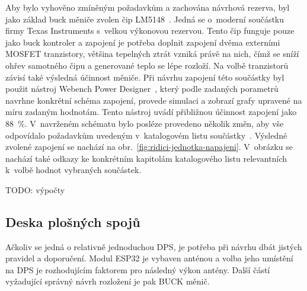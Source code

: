         Aby bylo vyhověno zmíněným požadavkům a zachována návrhová rezerva, byl jako základ buck měniče zvolen čip LM5148~\cite{lm5148-datasheet}. Jedná se o~moderní součástku firmy Texas Instruments s~velkou výkonovou rezervou. Tento čip funguje pouze jako buck kontroler a zapojení je potřeba doplnit zapojení dvěma externími MOSFET tranzistory, většina tepelných ztrát vzniká právě na nich, čímž se sníží ohřev samotného čipu a generované teplo se lépe rozloží. Na volbě tranzistorů závisí také výsledná účinnost měniče. Při návrhu zapojení této součástky byl použit nástroj Webench Power Designer~\cite{webench-power-designer}, který podle zadaných porametrů navrhne konkrétní schéma zapojení, provede simulaci a zobrazí grafy upravené na míru zadaným hodnotám. Tento nástroj uvádí přibližnou účinnost zapojení jako \qty{88}{\percent}. V~navrženém schématu bylo posléze provedeno několik změn, aby vše odpovídalo požadavkům uvedeným v~katalogovém listu součástky~\cite{lm5148-datasheet}. Výsledné zvolené zapojení se nachází na obr.~\ref{fig:ridici-jednotka-napajeni}. V~obrázku se nachází také odkazy ke konkrétním kapitolám katalogového listu relevantních k~volbě hodnot vybraných součástek. 

        TODO: výpočty 

    \subsection{Deska plošných spojů}
        Ačkoliv se jedná o relativně jednoduchou DPS, je potřeba při návrhu dbát jistých pravidel a doporučení. Modul ESP32 je vybaven anténou a volba jeho umístění na DPS je rozhodujícím faktorem pro následný výkon antény. Další částí vyžadující správný návrh rozložení je pak BUCK měnič. 
        
